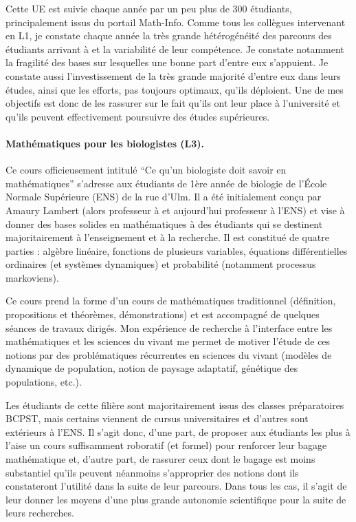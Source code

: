 Cette UE est suivie chaque année par un peu plus de 300 étudiants, principalement issus du portail Math-Info. Comme tous les collègues intervenant en L1, je constate chaque année la très grande hétérogénéité des parcours des étudiants arrivant à \SU et la variabilité de leur compétence. Je constate notamment la fragilité des bases sur lesquelles une bonne part d’entre eux s’appuient. Je constate aussi l’investissement de la très grande majorité d’entre eux dans leurs études, ainsi que les efforts, pas toujours optimaux, qu’ils déploient. Une de mes objectifs est donc de les rassurer sur le fait qu’ils ont leur place à l’université et qu’ils peuvent effectivement poursuivre des études supérieures.

\paragraph{Mathématiques pour les biologistes (L3).}
Ce cours officieusement intitulé “Ce qu'un biologiste doit savoir en mathématiques'' s'adresse aux étudiants de 1ère année de biologie de l'École Normale Supérieure (ENS) de la rue d’Ulm. Il a été initialement conçu par Amaury Lambert (alors professeur à \SU et aujourd'hui professeur à l'ENS) et vise à donner des bases solides en mathématiques à des étudiants qui se destinent majoritairement à l’enseignement et à la recherche. Il est constitué de quatre parties : algèbre linéaire, fonctions de plusieurs variables, équations différentielles ordinaires (et systèmes dynamiques) et probabilité (notamment processus markoviens).

Ce cours prend la forme d’un cours de mathématiques traditionnel (définition, propositions et théorèmes, démonstrations) et est accompagné de quelques séances de travaux dirigés. Mon expérience de recherche à l’interface entre les mathématiques et les sciences du vivant me permet de motiver l’étude de ces notions par des problématiques récurrentes en sciences du vivant (modèles de dynamique de population, notion de paysage adaptatif, génétique des populations, etc.).

Les étudiants de cette filière sont majoritairement issus des classes préparatoires BCPST, mais certains viennent de cursus universitaires et d’autres sont extérieurs à l’ENS. Il s’agit donc, d’une part, de proposer aux étudiants les plus à l’aise un cours suffisamment roboratif (et formel) pour renforcer leur bagage mathématique et, d’autre part, de rassurer ceux dont le bagage est moins substantiel qu’ils peuvent néanmoins s’approprier des notions dont ils constateront l'utilité dans la suite de leur parcours. Dans tous les cas, il s’agit de leur donner les moyens d’une plus grande autonomie scientifique pour la suite de leurs recherches.

